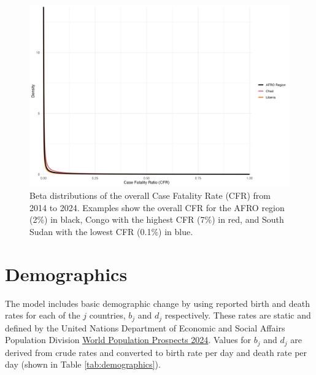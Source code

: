 \documentclass[
]{book}
\begin{document}
\begin{figure}

{\centering \includegraphics[width=0.95\linewidth]{figures/case_fatality_ratio_beta_distributions} 

}

\caption{Beta distributions of the overall Case Fatality Rate (CFR) from 2014 to 2024. Examples show the overall CFR for the AFRO region (2\%) in black, Congo with the highest CFR (7\%) in red, and South Sudan with the lowest CFR (0.1\%) in blue.}\label{fig:cfr-beta}
\end{figure}

\section{Demographics}\label{demographics-1}

The model includes basic demographic change by using reported birth and death rates for each of the \(j\) countries, \(b_j\) and \(d_j\) respectively. These rates are static and defined by the United Nations Department of Economic and Social Affairs Population Division \href{https://population.un.org/wpp/Download/Standard/CSV/}{World Population Prospects 2024}. Values for \(b_j\) and \(d_j\) are derived from crude rates and converted to birth rate per day and death rate per day (shown in Table \ref{tab:demographics}).
\end{document}
